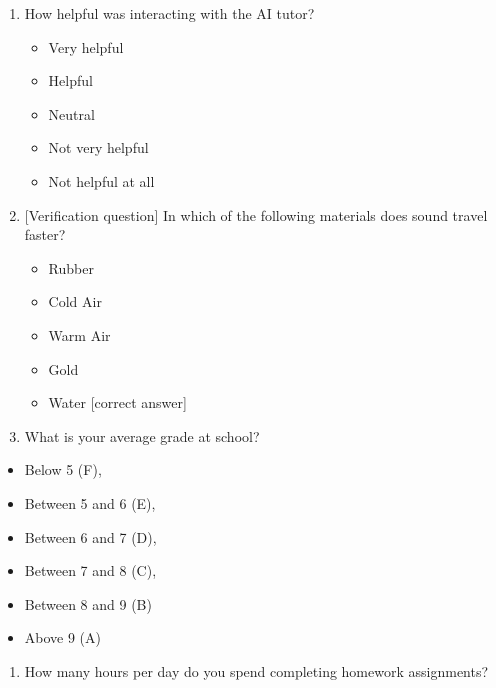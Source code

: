 \documentclass[
  11pt,
]{article}
\providecommand{\tightlist}{%
  \setlength{\itemsep}{0pt}\setlength{\parskip}{0pt}}
\begin{document}
\begin{enumerate}
  \begin{itemize}
  \tightlist
  \item
    Very confident
  \item
    Confident
  \item
    Neutral
  \item
    Not very confident
  \item
    Not confident at all
  \end{itemize}
\item
  How helpful was interacting with the AI tutor?

  \begin{itemize}
  \tightlist
  \item
    Very helpful
  \item
    Helpful
  \item
    Neutral
  \item
    Not very helpful
  \item
    Not helpful at all
  \end{itemize}
\item
  {[}Verification question{]} In which of the following materials does sound travel faster?

  \begin{itemize}
  \tightlist
  \item
    Rubber
  \item
    Cold Air
  \item
    Warm Air
  \item
    Gold
  \item
    Water {[}correct answer{]}
  \end{itemize}
\item
  What is your average grade at school?
\end{enumerate}

\begin{itemize}
\tightlist
\item
  Below 5 (F),
\item
  Between 5 and 6 (E),
\item
  Between 6 and 7 (D),
\item
  Between 7 and 8 (C),
\item
  Between 8 and 9 (B)
\item
  Above 9 (A)
\end{itemize}

\begin{enumerate}
\def\labelenumi{\arabic{enumi}.}
\setcounter{enumi}{26}
\tightlist
\item
  How many hours per day do you spend completing homework assignments?
\end{enumerate}
\end{document}
